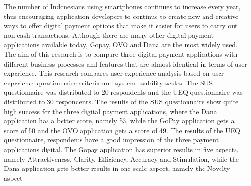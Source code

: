 \documentclass[
 manuscript=article,  %
  layout=publish, 
  year=2024, 
  month= Februari, %
  volume=8,
  number=1 
]{JIKO}
\begin{document}
\begin{abstracting}
\noindent\hspace{0.6cm}  The number of Indonesians using smartphones continues to increase every year, thus encouraging application developers to continue to create new and creative ways to offer digital payment options that make it easier for users to carry out non-cash transactions. Although there are many other digital payment applications available today, Gopay, OVO and Dana are the most widely used. The aim of this research is to compare three digital payment applications with different business processes and features that are almost identical in terms of user experience. This research compares user experience analysis based on user experience questionnaire criteria and system usability scales. The SUS questionnaire was distributed to 20 respondents and the UEQ questionnaire was distributed to 30 respondents. The results of the SUS questionnaire show quite high success for the three digital payment applications, where the Dana application has a better score, namely 53, while the GoPay application gets a score of 50 and the OVO application gets a score of 49. The results of the UEQ questionnaire, respondents have a good impression of the three payment applications digital. The Gopay application has superior results in five aspects, namely Attractiveness, Clarity, Efficiency, Accuracy and Stimulation, while the Dana application gets better results in one scale aspect, namely the Novelty aspect
\end{abstracting}
\end{document}
